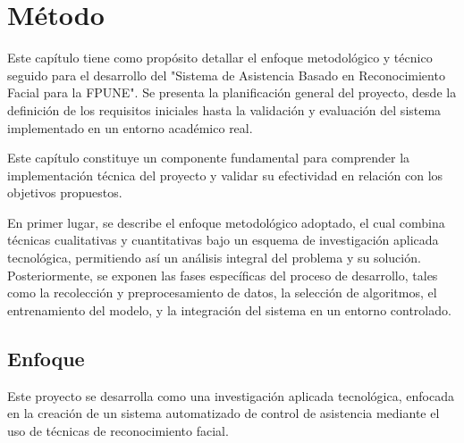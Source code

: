 \fancyhead{}
\fancyfoot{}
\cfoot{\thepage}



\chapter{Método}

Este capítulo tiene como propósito detallar el enfoque metodológico y técnico seguido para el desarrollo del "Sistema de Asistencia Basado en Reconocimiento Facial para la FPUNE". Se presenta la planificación general del proyecto, desde la definición de los requisitos iniciales hasta la validación y evaluación del sistema implementado en un entorno académico real.

Este capítulo constituye un componente fundamental para comprender la implementación técnica del proyecto y validar su efectividad en relación con los objetivos propuestos.

En primer lugar, se describe el enfoque metodológico adoptado, el cual combina técnicas cualitativas y cuantitativas bajo un esquema de investigación aplicada tecnológica, permitiendo así un análisis integral del problema y su solución. Posteriormente, se exponen las fases específicas del proceso de desarrollo, tales como la recolección y preprocesamiento de datos, la selección de algoritmos, el entrenamiento del modelo, y la integración del sistema en un entorno controlado.
\section{Enfoque}

Este proyecto se desarrolla como una investigación aplicada tecnológica, enfocada en la creación de un sistema automatizado de control de asistencia mediante el uso de técnicas de reconocimiento facial. 

